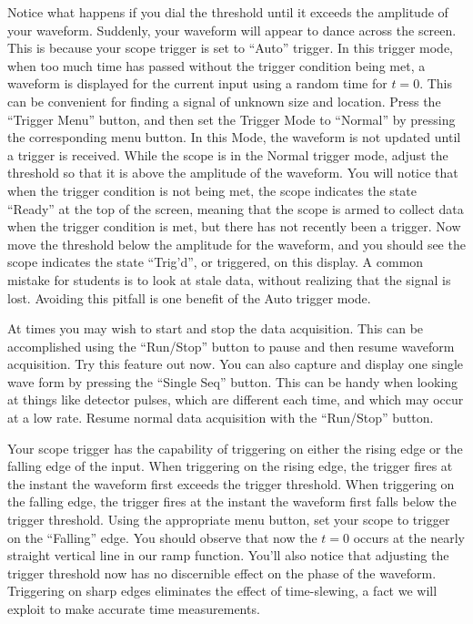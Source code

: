 Notice what happens if you dial the threshold until it exceeds the
amplitude of your waveform.  Suddenly, your waveform will appear to
dance across the screen.  This is because your scope trigger is set to
``Auto'' trigger.  In this trigger mode, when too much time has passed
without the trigger condition being met, a waveform is displayed for
the current input using a random time for $t=0$.  This can be
convenient for finding a signal of unknown size and location.  Press
the ``Trigger Menu'' button, and then set the Trigger Mode to
``Normal'' by pressing the corresponding menu button.  In this Mode,
the waveform is not updated until a trigger is received.  While the
scope is in the Normal trigger mode, adjust the threshold so that it
is above the amplitude of the waveform.  You will notice that when the
trigger condition is not being met, the scope indicates the state
``Ready'' at the top of the screen, meaning that the scope is armed to
collect data when the trigger condition is met, but there has not
recently been a trigger.  Now move the threshold below the amplitude
for the waveform, and you should see the scope indicates the state
``Trig'd'', or triggered, on this display.  A common mistake for
students is to look at stale data, without realizing that the signal
is lost.  Avoiding this pitfall is one benefit of the Auto trigger
mode.

At times you may wish to start and stop the data acquisition.  This
can be accomplished using the ``Run/Stop'' button to pause and then
resume waveform acquisition.  Try this feature out now.  You can also
capture and display one single wave form by pressing the ``Single
Seq'' button.  This can be handy when looking at things like detector
pulses, which are different each time, and which may occur at a low
rate.  Resume normal data acquisition with the ``Run/Stop'' button.

Your scope trigger has the capability of triggering on either the
rising edge or the falling edge of the input.  When triggering on the
rising edge, the trigger fires at the instant the waveform first
exceeds the trigger threshold.  When triggering on the falling edge,
the trigger fires at the instant the waveform first falls below the
trigger threshold.  Using the appropriate menu button, set your scope
to trigger on the ``Falling'' edge.  You should observe that now the
$t=0$ occurs at the nearly straight vertical line in our ramp
function.  You'll also notice that adjusting the trigger threshold now
has no discernible effect on the phase of the waveform.  Triggering on
sharp edges eliminates the effect of time-slewing, a fact we will
exploit to make accurate time measurements.


